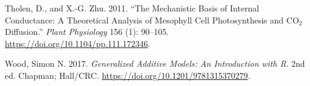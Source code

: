 \documentclass[
  letterpaper,
  DIV=11,
  numbers=noendperiod]{scrartcl}
\newlength{\cslhangindent}
\newlength{\cslentryspacingunit} %
\newenvironment{CSLReferences}[2] %
 {%
  \setlength{\parindent}{0pt}
  \ifodd #1
  \let\oldpar\par
  \def\par{\hangindent=\cslhangindent\oldpar}
  \fi
  \setlength{\parskip}{#2\cslentryspacingunit}
 }%
 {}
\begin{document}
\begin{CSLReferences}{1}{0}
\leavevmode{}%
Tholen, D., and X.-G. Zhu. 2011. {``The Mechanistic Basis of Internal
Conductance: {A} Theoretical Analysis of Mesophyll Cell Photosynthesis
and {CO}\(_{\textrm{2}}\) Diffusion.''} \emph{Plant Physiology} 156 (1):
90--105. \url{https://doi.org/10.1104/pp.111.172346}.

\leavevmode{}%
Wood, Simon N. 2017. \emph{Generalized {Additive} {Models}: {An}
{Introduction} with {R}}. 2nd ed. Chapman; Hall/CRC.
\url{https://doi.org/10.1201/9781315370279}.

\end{CSLReferences}
\end{document}
